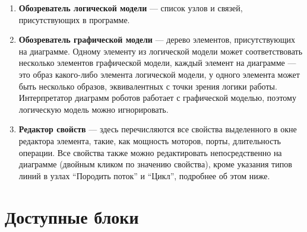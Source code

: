 \documentclass[a4paper,12pt,twoside]{article}
\begin{document}
\begin{enumerate}
  \item \textbf{Обозреватель логической модели} --- список узлов и связей, присутствующих в программе.
  \item \textbf{Обозреватель графической модели} --- дерево элементов, присутствующих на диаграмме. Одному элементу из логической модели может соответствовать несколько элементов графической модели, каждый элемент на диаграмме --- это образ какого-либо элемента логической модели, у одного элемента может быть несколько образов, эквивалентных с точки зрения логики работы. Интерпретатор диаграмм роботов работает с графической моделью, поэтому логическую модель можно игнорировать.
  \item \textbf{Редактор свойств} --- здесь перечисляются все свойства выделенного в окне редактора элемента, такие, как мощность моторов, порты, длительность операции. Все свойства также можно редактировать непосредственно на диаграмме (двойным кликом по значению свойства), кроме указания типов линий в узлах "`Породить поток"' и "`Цикл"', подробнее об этом ниже.
\end{enumerate}

\section{Доступные блоки}
\end{document}
